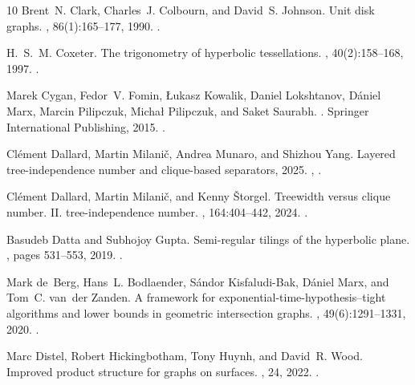 \documentclass[11pt]{article}
\begin{document}
\begin{thebibliography}{10}
Brent~N. Clark, Charles~J. Colbourn, and David~S. Johnson.
\newblock Unit disk graphs.
, 86(1):165--177, 1990.
\newblock \href {https://doi.org/10.1016/0012-365X(90)90358-O} {}.

H.~S.~M. Coxeter.
\newblock The trigonometry of hyperbolic tessellations.
, 40(2):158–168, 1997.
\newblock \href {https://doi.org/10.4153/CMB-1997-019-0} {}.

Marek Cygan, Fedor~V. Fomin, Łukasz Kowalik, Daniel Lokshtanov, Dániel Marx, Marcin Pilipczuk, Michał Pilipczuk, and Saket Saurabh.
.
\newblock Springer International Publishing, 2015.
\newblock \href {https://doi.org/10.1007/978-3-319-21275-3} {}.

Clément Dallard, Martin Milanič, Andrea Munaro, and Shizhou Yang.
\newblock Layered tree-independence number and clique-based separators, 2025.
\newblock \href {https://arxiv.org/abs/2506.12424} {}, \href {https://doi.org/10.48550/arXiv.2506.12424} {}.

Clément Dallard, Martin Milanič, and Kenny Štorgel.
\newblock Treewidth versus clique number. {II.} tree-independence number.
, 164:404--442, 2024.
\newblock \href {https://doi.org/10.1016/j.jctb.2023.10.006} {}.

Basudeb Datta and Subhojoy Gupta.
\newblock Semi-regular tilings of the hyperbolic plane.
, pages 531--553, 2019.
\newblock \href {https://doi.org/10.1007/s00454-019-00156-0} {}.

Mark de~Berg, Hans~L. Bodlaender, S\'{a}ndor Kisfaludi-Bak, D\'{a}niel Marx, and Tom~C. van~der Zanden.
\newblock A framework for exponential-time-hypothesis--tight algorithms and lower bounds in geometric intersection graphs.
, 49(6):1291--1331, 2020.
\newblock \href {https://doi.org/10.1137/20M1320870} {}.

Marc Distel, Robert Hickingbotham, Tony Huynh, and David~R. Wood.
\newblock Improved product structure for graphs on surfaces.
, 24, 2022.
\newblock \href {https://doi.org/10.46298/dmtcs.8877} {}.


\end{thebibliography}
\end{document}
